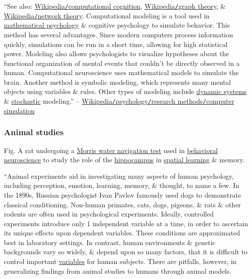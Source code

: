 \documentclass[oneside]{book}
\numberwithin{equation}{section}
\begin{document}
``See also: \href{https://en.wikipedia.org/wiki/Computational_cognition}{Wikipedia\texttt{/}computational cognition}, \href{https://en.wikipedia.org/wiki/Graph_theory}{Wikipedia\texttt{/}graph theory}, \& \href{https://en.wikipedia.org/wiki/Network_theory}{Wikipedia\texttt{/}network theory}. Computational modeling is a tool used in \href{https://en.wikipedia.org/wiki/Mathematical_psychology}{mathematical psychology} \& cognitive psychology to simulate behavior. This method has several advantages. Since modern computers process information quickly, simulations can be run in a short time, allowing for high statistical power. Modeling also allows psychologists to visualize hypotheses about the functional organization of mental events that couldn't be directly observed in a human. Computational neuroscience uses mathematical models to simulate the brain. Another method is symbolic modeling, which represents many mental objects using variables \& rules. Other types of modeling include \href{https://en.wikipedia.org/wiki/Dynamic_systems}{dynamic systems} \& \href{https://en.wikipedia.org/wiki/Stochastic_process}{stochastic} modeling.'' -- \href{https://en.wikipedia.org/wiki/Psychology#Computer_simulation}{Wikipedia\texttt{/}psychology\texttt{/}research methods\texttt{/}computer simulation}

\subsubsection{Animal studies}
\textsf{Fig. A rat undergoing a \href{https://en.wikipedia.org/wiki/Morris_water_navigation_test}{Morris water navigation test} used in \href{https://en.wikipedia.org/wiki/Behavioral_neuroscience}{behavioral neuroscience} to study the role of the \href{https://en.wikipedia.org/wiki/Hippocampus}{hippocampus} in \href{https://en.wikipedia.org/wiki/Spatial_learning}{spatial learning} \& memory.}

``Animal experiments aid in investigating many aspects of human psychology, including perception, emotion, learning, memory, \& thought, to name a few. In the 1890s, Russian psychologist Ivan Pavlov famously used dogs to demonstrate classical conditioning. Non-human primates, cats, dogs, pigeons, \& rats \& other rodents are often used in psychological experiments. Ideally, controlled experiments introduce only 1 independent variable at a time, in order to ascertain its unique effects upon dependent variables. These conditions are approximated best in laboratory settings. In contrast, human environments \& genetic backgrounds vary so widely, \& depend upon so many factors, that it is difficult to control important \href{https://en.wikipedia.org/wiki/Variable_(research)}{variables} for human subjects. There are pitfalls, however, in generalizing findings from animal studies to humans through animal models.
\end{document}
